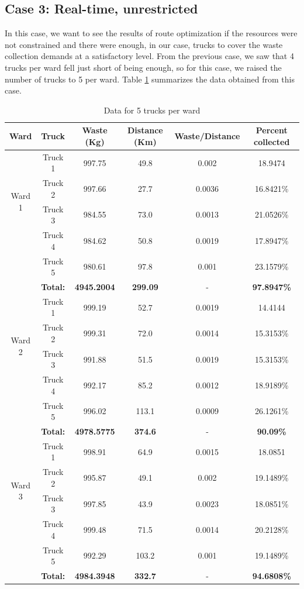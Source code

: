 \documentclass[12pt]{article}
\begin{document}
\subsection*{Case 3: Real-time, unrestricted}

In this case, we want to see the results of route optimization if the resources were not constrained and there were enough, in our case, trucks to cover the waste collection demands at a satisfactory level. From the previous case, we saw that 4 trucks per ward fell just short of being enough, so for this case, we raised the number of trucks to 5 per ward. Table \ref{tab3} summarizes the data obtained from this case.

\begin{table}[H]
    \centering
    \caption{ Data for 5 trucks per ward} \label{tab3}
    \vspace*{0.3cm}
    \begin{tabular}{|c|c|c|c|c|c|}
        \hline Ward & Truck & Waste (Kg) & Distance (Km) & Waste/Distance & Percent collected \\
        \hline \multirow{4}{*}{Ward 1} & Truck 1 &997.75  &49.8  &0.002  &18.9474 \\
        \cline{2-6}& Truck 2 &997.66&27.7&0.0036&16.8421\%\\        
        \cline{2-6}& Truck 3 &984.55&73.0&0.0013&21.0526\%\\        
        \cline{2-6}& Truck 4 &984.62&50.8&0.0019&17.8947\%\\
        \cline{2-6}& Truck 5 &980.61&97.8&0.001&23.1579\%\\
        \hline &\textbf{Total:} &\textbf{4945.2004} &\textbf{299.09} &- &\textbf{97.8947\%}\\
        \hline \multirow{4}{*}{Ward 2} & Truck 1 &999.19  &52.7  &0.0019  &14.4144 \\
        \cline{2-6}& Truck 2 &999.31&72.0&0.0014&15.3153\%\\        
        \cline{2-6}& Truck 3 &991.88&51.5&0.0019&15.3153\%\\        
        \cline{2-6}& Truck 4 &992.17&85.2&0.0012&18.9189\%\\      
        \cline{2-6}& Truck 5 &996.02&113.1&0.0009&26.1261\%\\
        \hline &\textbf{Total:} &\textbf{4978.5775} &\textbf{374.6} &- &\textbf{90.09\%}\\     
        \hline \multirow{4}{*}{Ward 3} & Truck 1 &998.91  &64.9  &0.0015  &18.0851 \\
        \cline{2-6}& Truck 2 &995.87&49.1&0.002&19.1489\%\\        
        \cline{2-6}& Truck 3 &997.85&43.9&0.0023&18.0851\%\\        
        \cline{2-6}& Truck 4 &999.48&71.5&0.0014&20.2128\%\\
        \cline{2-6}& Truck 5 &992.29&103.2&0.001&19.1489\%\\
        \hline &\textbf{Total:} &\textbf{4984.3948} &\textbf{332.7}&- &\textbf{94.6808\%}\\
        \hline      
    \end{tabular}
\end{table}
\end{document}
